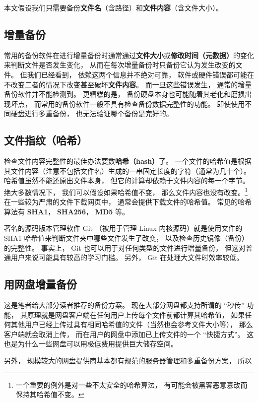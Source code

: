 本文假设我们只需要备份\textbf{文件名}（含路径）和\textbf{文件内容}（含文件大小）。

\subsection{增量备份}
常用的备份软件在进行增量备份时通常通过\textbf{文件大小}或\textbf{修改时间（元数据）}的变化来判断文件是否发生变化， 从而在每次增量备份时只备份它认为发生改变的文件。 但我们已经看到， 依赖这两个信息并不绝对可靠， 软件或硬件错误都可能在不改变二者的情况下改变甚至破坏\textbf{文件内容}。 而一旦这些错误发生， 通常的增量备份软件并不能检测到。 更糟糕的是， 备份硬盘本身也可能随着其老化和磨损出现坏点， 而常用的备份软件一般不具有检查备份数据完整性的功能。 即使使用不同硬盘进行多重备份， 也无法验证哪个备份是完好的。

\subsection{文件指纹（哈希）}
检查文件内容完整性的最佳办法要数\textbf{哈希（hash）}了。 一个文件的哈希值是根据其文件内容（注意不包括文件名）生成的一串固定长度的字符（通常为几十个）。 哈希值虽然不能还原出文件本身， 但它的计算却依赖于文件内容的每一个字节。 绝大多数情况下， 我们可以假设如果哈希值不变， 那么文件内容也没有改变。\footnote{一个重要的例外是对一些不太安全的哈希算法， 有可能会被黑客恶意篡改而保持其哈希值不变。}在一些较为严肃的文件下载网页中， 通常会提供下载文件的哈希值。 常见的哈希算法有 \textbf{SHA1}， \textbf{SHA256}， \textbf{MD5} 等。

著名的源码版本管理软件 Git （被用于管理 Linux 内核源码）就是使用文件的 SHA1 哈希值来判断文件夹中哪些文件发生了改变， 以及检查历史镜像（备份）的完整性。 事实上， Git 也可以用于对任何类型的文件进行增量备份， 但这对普通用户来说可能具有较高的学习门槛。 另外， Git 在处理大文件时效率较低。

\subsection{用网盘增量备份}
这是笔者给大部分读者推荐的备份方案。 现在大部分网盘都支持所谓的 “秒传” 功能， 其原理就是网盘客户端在任何用户上传每个文件前都计算其哈希值， 如果任何其他用户已经上传过具有相同哈希值的文件（当然也会参考文件大小等）， 那么客户端就会取消上传， 而在用户的网盘中添加已上传文件的一个 “快捷方式”。 这也是为什么一些网盘可以用极低费用提供巨大储存空间。

另外， 规模较大的网盘提供商基本都有规范的服务器管理和多重备份方案， 所以
